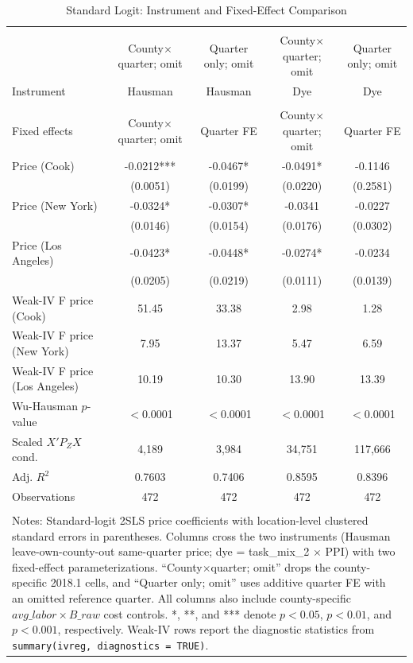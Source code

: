 \begin{table}[!htbp] \centering
  \caption{Standard Logit: Instrument and Fixed-Effect Comparison}
  \label{tab:standard_iv_comparison}
  \begin{tabular}{lcccc}
\\[-1.8ex]\hline
\hline \\[-1.8ex]
 & County$\times$quarter; omit & Quarter only; omit & County$\times$quarter; omit & Quarter only; omit \\
Instrument & Hausman & Hausman & Dye & Dye \\
\hline \\[-1.8ex]
Fixed effects & County$\times$quarter; omit & Quarter FE & County$\times$quarter; omit & Quarter FE \\
Price (Cook) & -0.0212*** & -0.0467* & -0.0491* & -0.1146 \\
 & (0.0051) & (0.0199) & (0.0220) & (0.2581) \\
Price (New York) & -0.0324* & -0.0307* & -0.0341 & -0.0227 \\
 & (0.0146) & (0.0154) & (0.0176) & (0.0302) \\
Price (Los Angeles) & -0.0423* & -0.0448* & -0.0274* & -0.0234 \\
 & (0.0205) & (0.0219) & (0.0111) & (0.0139) \\
Weak-IV F price (Cook) & 51.45 & 33.38 & 2.98 & 1.28 \\
Weak-IV F price (New York) & 7.95 & 13.37 & 5.47 & 6.59 \\
Weak-IV F price (Los Angeles) & 10.19 & 10.30 & 13.90 & 13.39 \\
Wu-Hausman $p$-value & $<$0.0001 & $<$0.0001 & $<$0.0001 & $<$0.0001 \\
Scaled $X'P_ZX$ cond. & 4,189 & 3,984 & 34,751 & 117,666 \\
Adj. $R^2$ & 0.7603 & 0.7406 & 0.8595 & 0.8396 \\
Observations & 472 & 472 & 472 & 472 \\
\hline \\[-1.8ex]
\multicolumn{5}{p{0.92\linewidth}}{\footnotesize Notes: Standard-logit 2SLS price coefficients with location-level clustered standard errors in parentheses. Columns cross the two instruments (Hausman leave-own-county-out same-quarter price; dye = task\_mix\_2 $\times$ PPI) with two fixed-effect parameterizations. ``County$\times$quarter; omit'' drops the county-specific 2018.1 cells, and ``Quarter only; omit'' uses additive quarter FE with an omitted reference quarter. All columns also include county-specific $avg\_labor \times B\_raw$ cost controls. *, **, and *** denote $p<0.05$, $p<0.01$, and $p<0.001$, respectively. Weak-IV rows report the diagnostic statistics from \texttt{summary(ivreg, diagnostics = TRUE)}.}\\
\end{tabular}
\end{table}
